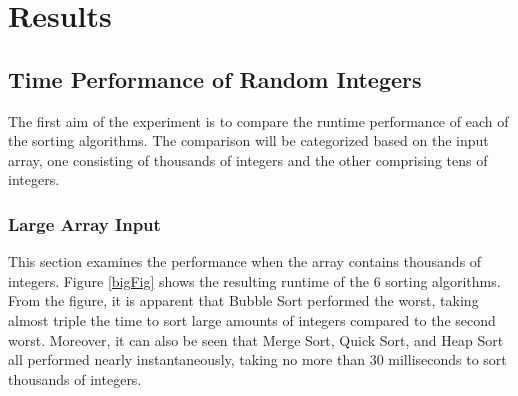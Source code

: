 \documentclass{report}
\begin{document}
\section{Results}

\subsection{Time Performance of Random Integers}
The first aim of the experiment is to compare the runtime performance of each of the sorting algorithms. The comparison will be categorized based on the input array, one consisting of thousands of integers and the other comprising tens of integers.

\subsubsection{Large Array Input}
 This section examines the performance when the array contains thousands of integers. Figure \ref{bigFig} shows the resulting runtime of the 6 sorting algorithms. From the figure, it is apparent that Bubble Sort performed the worst, taking almost triple the time to sort large amounts of integers compared to the second worst. Moreover, it can also be seen that Merge Sort, Quick Sort, and Heap Sort all performed nearly instantaneously, taking no more than $30$ milliseconds to sort thousands of integers.
\end{document}
